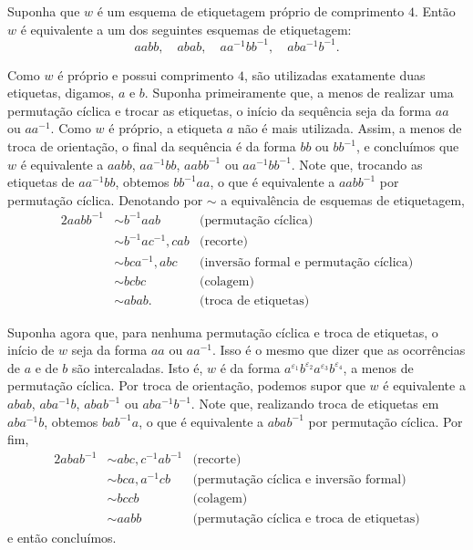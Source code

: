 \begin{lemma} %
    Suponha que $w$ é um esquema de etiquetagem próprio de comprimento $4$. Então $w$ é equivalente a um dos seguintes esquemas de etiquetagem:
    \[aabb,\quad abab,\quad aa^{-1}bb^{-1},\quad aba^{-1}b^{-1}.\]

    \begin{dem}
        Como $w$ é próprio e possui comprimento $4$, são utilizadas exatamente duas etiquetas, digamos, $a$ e $b$. Suponha primeiramente que, a menos de realizar uma permutação cíclica e trocar as etiquetas, o início da sequência seja da forma $aa$ ou $aa^{-1}$. Como $w$ é próprio, a etiqueta $a$ não é mais utilizada. Assim, a menos de troca de orientação, o final da sequência é da forma $bb$ ou $bb^{-1}$, e concluímos que $w$ é equivalente a $aabb$, $aa^{-1}bb$, $aabb^{-1}$ ou $aa^{-1}bb^{-1}$. Note que, trocando as etiquetas de $aa^{-1}bb$, obtemos $bb^{-1}aa$, o que é equivalente a $aabb^{-1}$ por permutação cíclica. Denotando por $\sim$ a equivalência de esquemas de etiquetagem,
        \begin{alignat*}{2}
            aabb^{-1} &\sim b^{-1}aab &\text{(permutação cíclica)}\\
            &\sim b^{-1}ac^{-1}, cab &\text{(recorte)}\\
            &\sim bca^{-1}, abc &\text{(inversão formal e permutação cíclica)}\\
            &\sim bcbc &\text{(colagem)}\\
            &\sim abab. &\text{(troca de etiquetas)}
        \end{alignat*}
        
        Suponha agora que, para nenhuma permutação cíclica e troca de etiquetas, o início de $w$ seja da forma $aa$ ou $aa^{-1}$. Isso é o mesmo que dizer que as ocorrências de $a$ e de $b$ são intercaladas. Isto é, $w$ é da forma $a^{\varepsilon_1}b^{\varepsilon_2}a^{\varepsilon_3}b^{\varepsilon_4}$, a menos de permutação cíclica. Por troca de orientação, podemos supor que $w$ é equivalente a $abab$, $aba^{-1}b$, $abab^{-1}$ ou $aba^{-1}b^{-1}$. Note que, realizando troca de etiquetas em $aba^{-1}b$, obtemos $bab^{-1}a$, o que é equivalente a $abab^{-1}$ por permutação cíclica. Por fim,
        \begin{alignat*}{2}
            abab^{-1} &\sim abc, c^{-1}ab^{-1} &\text{(recorte)}\\
            &\sim bca, a^{-1}cb &\text{(permutação cíclica e inversão formal)}\\
            &\sim bccb &\text{(colagem)}\\
            &\sim aabb &\text{(permutação cíclica e troca de etiquetas)}
        \end{alignat*}
        e então concluímos.
    \end{dem}
\end{lemma}


